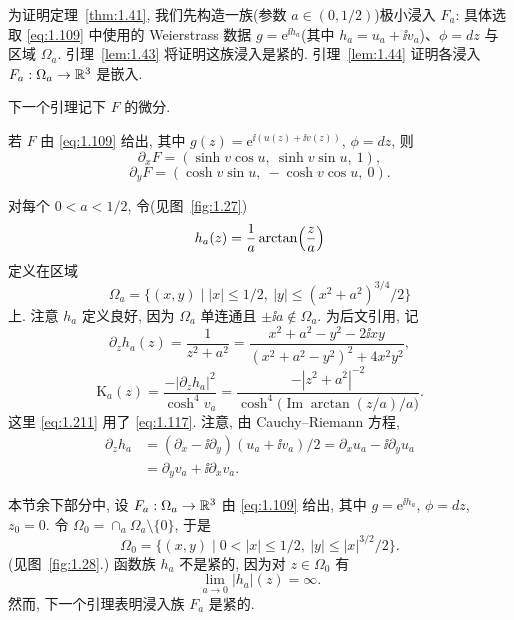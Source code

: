 为证明定理~\ref{thm:1.41}, 我们先构造一族(参数 $a\in(0,1/2)$)极小浸入
$F_a$: 具体选取 \eqref{eq:1.109} 中使用的 Weierstrass 数据
$g=\mathrm{e}^{\ii h_a}$(其中 $h_a=u_a+\ii v_a$)、$\phi=dz$ 与区域
$\Omega_a$. 引理~\ref{lem:1.43} 将证明这族浸入是紧的.
引理~\ref{lem:1.44} 证明各浸入 $F_a:\Omega_a\to\mathbb{R}^3$ 是嵌入.

下一个引理记下 $F$ 的微分.

\begin{lemma}
\label{lem:1.42}
若 $F$ 由 \eqref{eq:1.109} 给出, 其中
$g(z)=\mathrm{e}^{\ii(u(z)+\ii v(z))}$, $\phi=dz$, 则
\begin{equation}
\partial_xF=(\sinh v\cos u,\ \sinh v\sin u,\ 1),
\label{eq:1.206}
\end{equation}
\begin{equation}
\partial_yF=(\cosh v\sin u,\ -\cosh v\cos u,\ 0).
\label{eq:1.207}
\end{equation}
\end{lemma}

对每个 $0<a<1/2$, 令(见图~\ref{fig:1.27})
\begin{equation}
h_a(z)=\frac1a\arctan\Bigl(\frac za\Bigr)
\label{eq:1.208}
\end{equation}
定义在区域
\begin{equation}
\Omega_a=\bigl\{(x,y)\mid |x|\leq1/2,\
 |y|\leq(x^2+a^2)^{3/4}/2\bigr\}
\label{eq:1.209}
\end{equation}
上. 注意 $h_a$ 定义良好, 因为 $\Omega_a$ 单连通且 $\pm\ii a\notin\Omega_a$.
为后文引用, 记
\begin{equation}
\partial_z h_a(z)=\frac{1}{z^2+a^2}
 =\frac{x^2+a^2-y^2-2\ii xy}{(x^2+a^2-y^2)^2+4x^2y^2},
\label{eq:1.210}
\end{equation}
\begin{equation}
\mathrm{K}_a(z)
 =\frac{-|\partial_z h_a|^{2}}{\cosh^{4}v_a}
 =\frac{-|z^2+a^2|^{-2}}
 {\cosh^{4}\bigl(\operatorname{Im}\arctan(z/a)/a\bigr)}.
\label{eq:1.211}
\end{equation}
这里 \eqref{eq:1.211} 用了 \eqref{eq:1.117}. 注意, 由 Cauchy--Riemann 方程,
\begin{equation}
\begin{aligned}
\partial_z h_a
&=(\partial_x-\ii\partial_y)(u_a+\ii v_a)/2
 =\partial_x u_a-\ii\partial_y u_a\\
&=\partial_y v_a+\ii\partial_x v_a.
\end{aligned}
\label{eq:1.212}
\end{equation}

本节余下部分中, 设 $F_a:\Omega_a\to\mathbb{R}^3$ 由 \eqref{eq:1.109} 给出, 其中
$g=\mathrm{e}^{\ii h_a}$, $\phi=dz$, $z_0=0$. 令
$\Omega_0=\cap_a\Omega_a\setminus\{0\}$, 于是
\begin{equation}
\Omega_0=\bigl\{(x,y)\mid 0<|x|\leq1/2,\ |y|\leq|x|^{3/2}/2\bigr\}.
\label{eq:1.213}
\end{equation}
(见图~\ref{fig:1.28}.) 函数族 $h_a$ 不是紧的, 因为对 $z\in\Omega_0$ 有
\[
\lim_{a\to0}|h_a|(z)=\infty.
\]
然而, 下一个引理表明浸入族 $F_a$ 是紧的.

